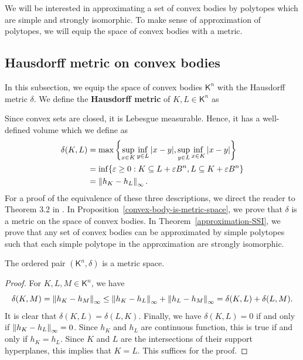 \documentclass{puthesis-UG}
\begin{document}
We will be interested in approximating a set of convex bodies by polytopes which are simple and strongly isomorphic. To make sense of approximation of polytopes, we will equip the space of convex bodies with a metric.

\subsection{Hausdorff metric on convex bodies}

In this subsection, we equip the space of convex bodies $\mathsf{K}^n$ with the Hausdorff metric $\delta$. We define the \textbf{Hausdorff metric} of $K, L \in \mathsf{K}^n$ as 

Since convex sets are closed, it is Lebesgue measurable. Hence, it has a well-defined volume which we define as 
\begin{align*}
	\delta (K, L) & = \max \left \{ \sup_{x \in K} \inf_{y \in L} |x-y|, \sup_{y \in L} \inf_{x \in K} |x-y|\right \} \\
	& = \inf \{\varepsilon \geq 0 : K \subseteq L + \varepsilon B^n, L \subseteq K + \varepsilon B^n\} \\
	& = \left\lVert h_K - h_L\right\rVert_\infty.
\end{align*}
For a proof of the equivalence of these three descriptions, we direct the reader to Theorem 3.2 in \cite{Hug2020-ue}. In Proposition~\ref{convex-body-is-metric-space}, we prove that $\delta$ is a metric on the space of convex bodies. In Theorem~\ref{approximation-SSI}, we prove that any set of convex bodies can be approximated by simple polytopes such that each simple polytope in the approximation are strongly isomorphic. 

\begin{prop} \label{convex-body-is-metric-space}
	The ordered pair $(\mathsf{K}^n, \delta)$ is a metric space. 
\end{prop}

\begin{proof}
	For $K, L, M \in \mathsf{K}^n$, we have 
	\[
		\delta(K, M) = \left\lVert h_K - h_M\right\rVert_\infty \leq \left\lVert h_K - h_L\right\rVert_\infty + \left\lVert h_L - h_M\right\rVert_\infty = \delta(K, L) + \delta(L, M). 
	\]
	It is clear that $\delta (K, L) = \delta (L, K)$. Finally, we have $\delta(K, L) = 0$ if and only if $\left\lVert h_K - h_L\right\rVert_\infty = 0$. Since $h_K$ and $h_L$ are continuous function, this is true if and only if $h_K = h_L$. Since $K$ and $L$ are the intersections of their support hyperplanes, this implies that $K = L$. This suffices for the proof. 
\end{proof}
\end{document}

